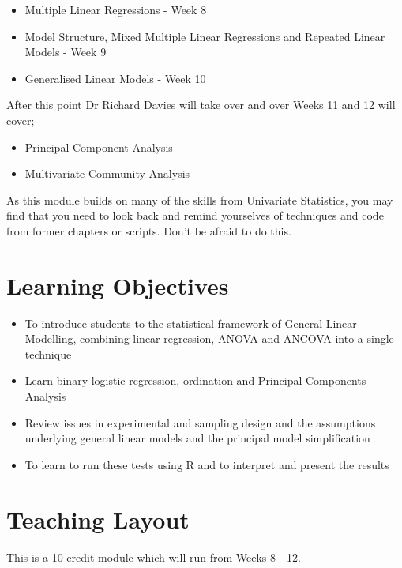 \documentclass[
]{book}
\providecommand{\tightlist}{%
  \setlength{\itemsep}{0pt}\setlength{\parskip}{0pt}}
\begin{document}
\begin{itemize}
\tightlist
\item
  Multiple Linear Regressions - Week 8
\item
  Model Structure, Mixed Multiple Linear Regressions and Repeated Linear Models - Week 9
\item
  Generalised Linear Models - Week 10
\end{itemize}

After this point Dr Richard Davies will take over and over Weeks 11 and 12 will cover;

\begin{itemize}
\tightlist
\item
  Principal Component Analysis
\item
  Multivariate Community Analysis
\end{itemize}

As this module builds on many of the skills from Univariate Statistics, you may find that you need to look back and remind yourselves of techniques and code from former chapters or scripts. Don't be afraid to do this.

\hypertarget{learning-objectives-1}{%
\section{Learning Objectives}\label{learning-objectives-1}}

\begin{itemize}
\tightlist
\item
  To introduce students to the statistical framework of General Linear Modelling, combining linear regression, ANOVA and ANCOVA into a single technique
\item
  Learn binary logistic regression, ordination and Principal Components Analysis
\item
  Review issues in experimental and sampling design and the assumptions underlying general linear models and the principal model simplification
\item
  To learn to run these tests using R and to interpret and present the results
\end{itemize}

\hypertarget{teaching-layout-1}{%
\section{Teaching Layout}\label{teaching-layout-1}}

This is a 10 credit module which will run from Weeks 8 - 12.
\end{document}
